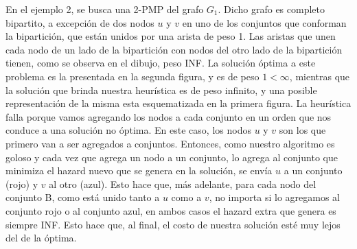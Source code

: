 \documentclass[11pt, a4paper, twoside]{article}
\begin{document}
\begin{enumerate}
		
		En el ejemplo 2, se busca una 2-PMP del grafo $G_{1}$.  Dicho grafo es completo bipartito,
		a excepción de dos nodos $u$ y $v$ en uno de los conjuntos que conforman la bipartición, que están unidos por una
		arista de peso 1. Las aristas que unen cada nodo de un lado de la bipartición con nodos del otro lado de la 
		bipartición tienen, como se observa en el dibujo, peso INF. 
		La solución óptima a este problema es la presentada en la segunda
		figura, y es de peso $1 < \infty$, mientras que la solución que brinda nuestra heurística es de peso
		infinito, y una posible representación de la misma esta esquematizada en la primera figura. 
		La heurística falla
		porque vamos agregando los nodos a cada conjunto en un orden que nos conduce a una solución no óptima. En este caso,
		los nodos $u$ y $v$ son los que primero van a ser agregados a conjuntos. Entonces, como nuestro algoritmo
		es goloso y cada vez que agrega un nodo a un conjunto, lo agrega al conjunto que minimiza el hazard nuevo que se
		genera en la solución, se envía $u$ a un conjunto (rojo) y $v$ al otro (azul). Esto hace que, más adelante, para 
		cada nodo del conjunto B, como está unido tanto a $u$ como a $v$, 
		no importa si lo agregamos al conjunto rojo o al conjunto azul, en ambos casos el hazard extra que genera
	    es siempre INF. Esto hace que, al final, el costo de nuestra solución esté muy lejos del de la óptima. \\
	    

\end{enumerate}
\end{document}
